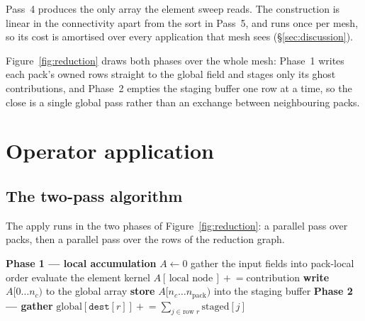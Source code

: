 \documentclass[sigconf,nonacm]{acmart}
\begin{document}
Pass~4 produces the only array the element sweep reads. The construction is linear in the
connectivity apart from the sort in Pass~5, and runs once per mesh, so its cost is amortised
over every application that mesh sees (\S\ref{sec:discussion}).

Figure~\ref{fig:reduction} draws both phases over the whole mesh: Phase~1 writes each pack's
owned rows straight to the global field and stages only its ghost contributions, and Phase~2
empties the staging buffer one row at a time, so the close is a single global pass rather than
an exchange between neighbouring packs.


\section{Operator application}
\label{sec:apply}

\subsection{The two-pass algorithm}

The apply runs in the two phases of Figure~\ref{fig:reduction}: a parallel pass over packs,
then a parallel pass over the rows of the reduction graph.

\begin{algorithm}
\caption{Packed operator application}
\label{alg:apply}
\begin{algorithmic}[1]
\Statex \textbf{Phase 1 --- local accumulation}
  \State $A \gets 0$ 
  \State gather the input fields into pack-local order
    \State evaluate the element kernel
    \State $A[\,\text{local node}\,] \mathrel{+}= \text{contribution}$
  \EndFor
  \State \textbf{write} $A[0 \ldots n_c)$ to the global array 
  \State \textbf{store} $A[n_c \ldots n_{\mathrm{pack}})$ into the staging buffer
\EndFor
\Statex \textbf{Phase 2 --- gather}
  \State $\text{global}[\texttt{dest}[r]] \mathrel{+}= \sum_{j \in \text{row } r}
         \text{staged}[j]$
\EndFor
\end{algorithmic}
\end{algorithm}
\end{document}
